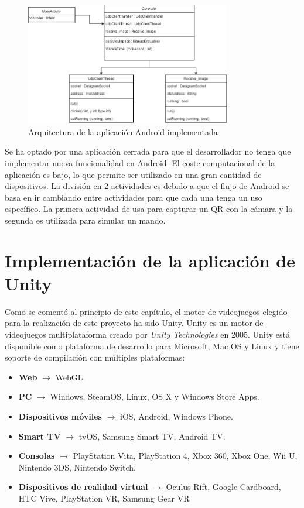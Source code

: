 \begin{figure}[h]

\centering
\includegraphics[width=0.8\textwidth]{./Imagenes/Bitmap/Arquitectura_App_Android}
\caption{Arquitectura de la aplicaci\'on Android implementada}
\end{figure}

Se ha optado por una aplicaci\'on cerrada para que el desarrollador no tenga que implementar nueva funcionalidad en Android. El coste computacional de la aplicaci\'on es bajo, lo que permite ser utilizado en una gran cantidad de dispositivos. La divisi\'on en 2 actividades es debido a que el flujo de Android se basa en ir cambiando entre actividades para que cada una tenga un uso espec\'ifico. La primera actividad de usa para capturar un QR con la c\'amara y la segunda es utilizada para simular un mando.

\section{Implementaci\'on de la aplicaci\'on de Unity}

Como se coment\'o al principio de este cap\'itulo, el motor de videojuegos elegido para la realizaci\'on de este proyecto ha sido Unity. Unity es un motor de videojuegos multiplataforma creado por \textit{Unity Technologies} en 2005. Unity est\'a disponible como plataforma de desarrollo para Microsoft, Mac OS y Linux y tiene soporte de compilaci\'on con m\'ultiples plataformas:

\begin {itemize}
\item \textbf{Web} $\rightarrow$ WebGL.
\item \textbf{PC} $\rightarrow$ Windows, SteamOS, Linux, OS X y Windows Store Apps.
\item \textbf{Dispositivos m\'oviles} $\rightarrow$ iOS, Android, Windows Phone.
\item \textbf{Smart TV} $\rightarrow$ tvOS, Samsung Smart TV, Android TV.
\item \textbf{Consolas} $\rightarrow$ PlayStation Vita, PlayStation 4, Xbox 360, Xbox One, Wii U, Nintendo 3DS, Nintendo Switch.
\item \textbf{Dispositivos de realidad virtual} $\rightarrow$ Oculus Rift, Google Cardboard, HTC Vive, PlayStation VR, Samsung Gear VR
\end {itemize}

